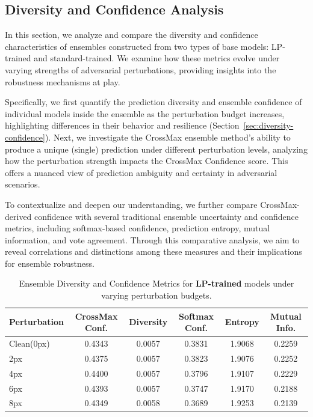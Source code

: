 \subsection{Diversity and Confidence Analysis}  
\label{sec:diversity-confidence-analysis}
\indent

In this section, we analyze and compare the diversity and confidence characteristics of ensembles constructed from two types of base models: LP-trained and standard-trained. We examine how these metrics evolve under varying strengths of adversarial perturbations, providing insights into the robustness mechanisms at play.

Specifically, we first quantify the prediction diversity and ensemble confidence of individual models inside the ensemble as the perturbation budget increases, highlighting differences in their behavior and resilience (Section~\ref{sec:diversity-confidence}). Next, we investigate the CrossMax ensemble method’s ability to produce a unique (single) prediction under different perturbation levels, analyzing how the perturbation strength impacts the CrossMax Confidence score. This offers a nuanced view of prediction ambiguity and certainty in adversarial scenarios.

To contextualize and deepen our understanding, we further compare CrossMax-derived confidence with several traditional ensemble uncertainty and confidence metrics, including softmax-based confidence, prediction entropy, mutual information, and vote agreement. Through this comparative analysis, we aim to reveal correlations and distinctions among these measures and their implications for ensemble robustness.

\begin{table}[htbp]
\centering
\small
\caption{Ensemble Diversity and Confidence Metrics for \textbf{LP-trained} models under varying perturbation budgets.}
\label{tab:diversity_confidence_lp}
\begin{tabular}{lccccc}
\toprule
\textbf{Perturbation} & \textbf{CrossMax Conf.} & \textbf{Diversity} & \textbf{Softmax Conf.} & \textbf{Entropy} & \textbf{Mutual Info.} \\
\midrule
Clean(0px)   & 0.4343 & 0.0057 & 0.3831 & 1.9068 & 0.2259 \\
2px   & 0.4375 & 0.0057 & 0.3823 & 1.9076 & 0.2252 \\
4px   & 0.4400 & 0.0057 & 0.3796 & 1.9107 & 0.2229 \\
6px   & 0.4393 & 0.0057 & 0.3747 & 1.9170 & 0.2188 \\
8px   & 0.4349 & 0.0058 & 0.3689 & 1.9253 & 0.2139 \\
\bottomrule
\end{tabular}
\end{table}


